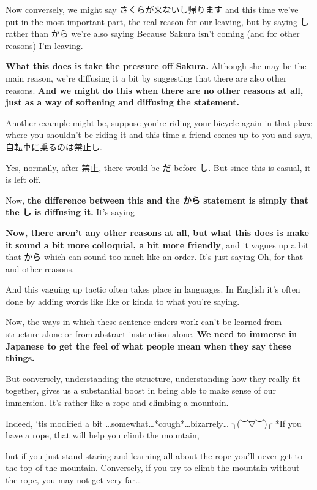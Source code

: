 Now conversely, we might say さくらが来ないし帰ります and this time we've put in the most important part, the real reason for our leaving, but by saying し rather than から we're also saying Because Sakura isn't coming (and for other reasons) I'm leaving.

{\bf What this does is take the pressure off Sakura.} Although she may be the main reason, we're diffusing it a bit by suggesting that there are also other reasons. {\bf And we might do this when there are no other reasons at all,} {\bf just as a way of softening and diffusing the statement.}

Another example might be, suppose you're riding your bicycle again in that place where you shouldn't be riding it and this time a friend comes up to you and says, 自転車に乗るのは禁止し.

{}

Yes, normally, after 禁止, there would be だ before し. But since this is casual, it is left off.

Now, {\bf the difference between this and the から statement} {\bf is simply that the し is diffusing it.} It's saying 

{\bf Now, there aren't any other reasons at all, but} {\bf what this does is make it sound a bit more colloquial, a bit more friendly},\crlf
and it vagues up a bit that から which can sound too much like an order. It's just saying Oh, for that and other reasons.

And this vaguing up tactic often takes place in languages. In English it's often done by adding words like like or kinda to what you're saying.

Now, the ways in which these sentence-enders work can't be learned from structure alone or from abstract instruction alone. {\bf We need to immerse in Japanese to get the feel of} {\bf what people mean when they say these things.}

But conversely, understanding the structure, understanding how they really fit together, gives us a substantial boost in being able to make sense of our immersion. It's rather like a rope and climbing a mountain.

{}

Indeed, ‘tis modified a bit \ldots{}somewhat\ldots{}*cough*\ldots{}bizarrely\ldots{} ╮(︶▽︶)╭\crlf
*If you have a rope, that will help you climb the mountain,

but if you just stand staring and learning all about the rope you'll never get to the top of the mountain. Conversely, if you try to climb the mountain without the rope, you may not get very far\ldots{}

\stopsectionlevel

\stopsectionlevel

